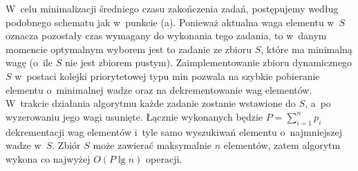 W~celu minimalizacji średniego czasu zakończenia zadań, postępujemy według podobnego schematu jak w~punkcie (a).
Ponieważ aktualna waga elementu w~$S$ oznacza pozostały czas wymagany do wykonania tego zadania, to w~danym momencie optymalnym wyborem jest to zadanie ze zbioru $S$, które ma minimalną wagę (o~ile $S$ nie jest zbiorem pustym).
Zaimplementowanie zbioru dynamicznego $S$ w~postaci kolejki priorytetowej typu min pozwala na szybkie pobieranie elementu o~minimalnej wadze oraz na dekrementowanie wag elementów.
W~trakcie działania algorytmu każde zadanie zostanie wstawione do $S$, a~po wyzerowaniu jego wagi usunięte.
Łącznie wykonanych będzie $P=\sum_{i=1}^np_i$ dekrementacji wag elementów i~tyle samo wyszukiwań elementu o~najmniejszej wadze w~$S$.
Zbiór $S$ może zawierać maksymalnie $n$ elementów, zatem algorytm wykona co najwyżej $O(P\lg n)$ operacji.
